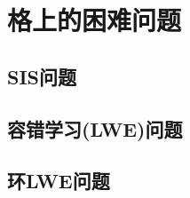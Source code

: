 \section{格上的困难问题}\label{sec:16-2}

\subsection{SIS问题}\label{subsec:16-2-1}

\subsection{容错学习(LWE)问题}\label{subsec:16-2-2}

\subsection{环LWE问题}\label{subsec:16-2-3}